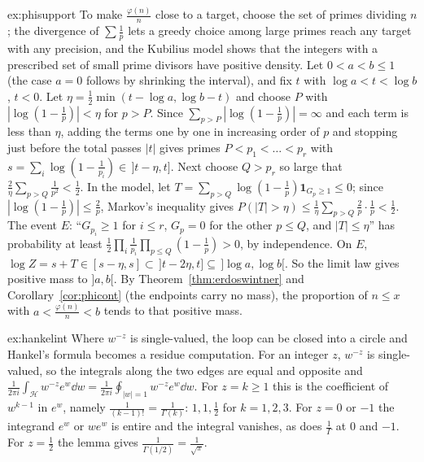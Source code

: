 \begin{solution}{ex:phisupport}
\idea To make $\frac{\varphi(n)}n$ close to a target, choose the set of primes dividing $n$; the divergence of $\sum\frac1p$ lets a greedy choice among large primes reach any target with any precision, and the Kubilius model shows that the integers with a prescribed set of small prime divisors have positive density.
\writeup Let $0<a<b\le1$ (the case $a=0$ follows by shrinking the interval), and fix $t$ with $\log a<t<\log b$, $t<0$. Let $\eta=\frac12\min(t-\log a,\log b-t)$ and choose $P$ with $|\log(1-\frac1p)|<\eta$ for $p>P$. Since $\sum_{p>P}|\log(1-\frac1p)|=\infty$ and each term is less than $\eta$, adding the terms one by one in increasing order of $p$ and stopping just before the total passes $|t|$ gives primes $P<p_1<\dots<p_r$ with $s=\sum_i\log(1-\frac1{p_i})\in\,]t-\eta,t]$. Next choose $Q>p_r$ so large that $\frac2\eta\sum_{p>Q}\frac1{p^2}<\frac12$. In the model, let $T=\sum_{p>Q}\log(1-\frac1p)\mathbf 1_{G_p\ge1}\le0$; since $|\log(1-\frac1p)|\le\frac2p$, Markov's inequality gives $P(|T|>\eta)\le\frac1\eta\sum_{p>Q}\frac2p\cdot\frac1p<\frac12$. The event $E$: ``$G_{p_i}\ge1$ for $i\le r$, $G_p=0$ for the other $p\le Q$, and $|T|\le\eta$'' has probability at least $\frac12\prod_i\frac1{p_i}\prod_{p\le Q}(1-\frac1p)>0$, by independence. On $E$, $\log Z=s+T\in[s-\eta,s]\subset\,]t-2\eta,t]\subseteq\,]\log a,\log b[$. So the limit law gives positive mass to $]a,b[$. By Theorem~\ref{thm:erdoswintner} and Corollary~\ref{cor:phicont} (the endpoints carry no mass), the proportion of $n\le x$ with $a<\frac{\varphi(n)}n<b$ tends to that positive mass.
\end{solution}

\begin{solution}{ex:hankelint}
\idea Where $w^{-z}$ is single-valued, the loop can be closed into a circle and Hankel's formula becomes a residue computation.
\writeup For an integer $z$, $w^{-z}$ is single-valued, so the integrals along the two edges are equal and opposite and $\frac1{2\pi i}\int_{\mathcal H}w^{-z}e^w\dd w=\frac1{2\pi i}\oint_{|w|=1}w^{-z}e^w\dd w$. For $z=k\ge1$ this is the coefficient of $w^{k-1}$ in $e^w$, namely $\frac1{(k-1)!}=\frac1{\Gamma(k)}$: $1,1,\frac12$ for $k=1,2,3$. For $z=0$ or $-1$ the integrand $e^w$ or $we^w$ is entire and the integral vanishes, as does $\frac1\Gamma$ at $0$ and $-1$. For $z=\frac12$ the lemma gives $\frac1{\Gamma(1/2)}=\frac1{\sqrt\pi}$.
\end{solution}

